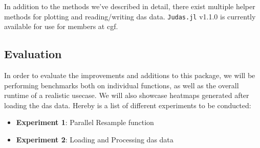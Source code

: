 In addition to the methods we've described in detail, there exist multiple helper methods for plotting and reading/writing \acrshort{das} data. \texttt{Judas.jl} v1.1.0 is currently available for use for members at \acrshort{cgf}. 

\subsection{Evaluation}

In order to evaluate the improvements and additions to this package, we will be performing benchmarks both on individual functions, as well as the overall runtime of a realistic usecase. We will also showcase heatmaps generated after loading the \acrshort{das} data. Hereby is a list of different experiments to be conducted:

\begin{itemize}
    \item \textbf{Experiment 1}: Parallel Resample function
    \item \textbf{Experiment 2}: Loading and Processing \acrshort{das} data
\end{itemize}
